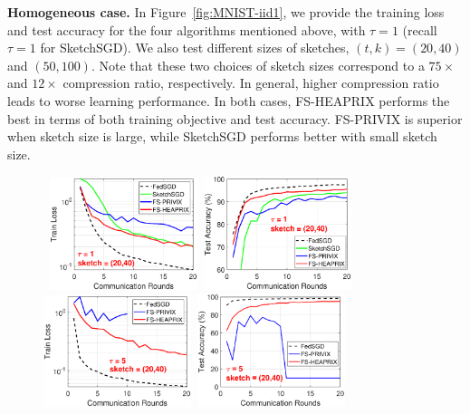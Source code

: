 \documentclass[twoside]{article}
\begin{document}
\textbf{Homogeneous case.} In Figure~\ref{fig:MNIST-iid1}, we provide the training loss and test accuracy for the four algorithms mentioned above, with $\tau=1$ (recall $\tau = 1$ for SketchSGD). 
We also test different sizes of sketches, $(t,k)=(20,40)$ and $(50,100)$. 
Note that these two choices of sketch sizes correspond to a $75\times$ and $12\times$ compression ratio, respectively. 
In general, higher compression ratio leads to worse learning performance. 
In both cases, FS-HEAPRIX performs the best in terms of both training objective and test accuracy. 
FS-PRIVIX is superior when sketch size is large, while SketchSGD performs better with small sketch size. 
\begin{figure}[t]
	\begin{center}
		\mbox{\hspace{-0.15in}			  
		 \includegraphics[width=1.7in]{MNIST_figures/local1_sketch20_iid1_train_loss.eps} \hspace{-0.12in}
		 \includegraphics[width=1.7in]{MNIST_figures/local1_sketch20_iid1_test_acc.eps} 
		 }
		\mbox{\hspace{-0.15in}	
		\includegraphics[width=1.7in]{MNIST_figures/local5_sketch20_iid1_train_loss.eps}\hspace{-0.12in}
		\includegraphics[width=1.7in]{MNIST_figures/local5_sketch20_iid1_test_acc.eps}
}
\end{center}
\end{figure}
\end{document}
